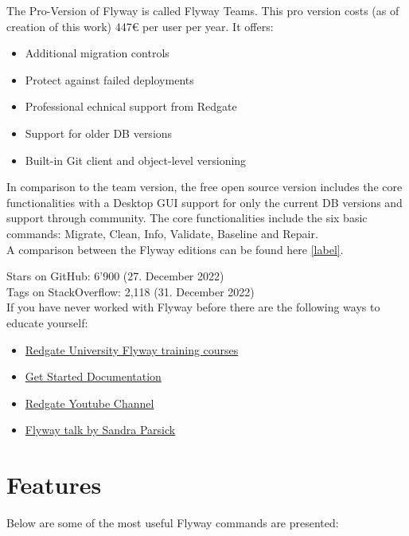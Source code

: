 %
The Pro-Version of Flyway is called Flyway Teams. This pro version costs (as of creation of this work) 447€ per user per year. It offers:
\begin{itemize}
	\item Additional migration controls
	\item Protect against failed deployments
	\item Professional echnical support from Redgate
	\item Support for older DB versions
	\item Built-in Git client and object-level versioning
\end{itemize}

In comparison to the team version, the free open source version includes the core functionalities with a Desktop GUI support for only the current DB versions and support through community. The core functionalities include the six basic commands: Migrate, Clean, Info, Validate, Baseline and Repair.\\

A comparison between the Flyway editions can be found here \autoref{label}.\\

%
Stars on GitHub: 6'900 (27. December 2022)\\
Tags on StackOverflow: 2,118 (31. December 2022)\\

%
If you have never worked with Flyway before there are the following ways to educate yourself:
\begin{itemize}
	\item \href{https://www.red-gate.com/hub/university/courses/flyway}{Redgate University Flyway training courses}
	\item \href{https://flywaydb.org/documentation}{Get Started Documentation}
	\item \href{https://www.youtube.com/playlist?list=PLhFdCK734P8DYHYYWaJpzJJ-qZFZ_JTHM}{Redgate Youtube Channel}
	\item \href{https://www.youtube.com/watch?v=dzRzlDpdDW4}{Flyway talk by Sandra Parsick}
\end{itemize}

\section{Features \label{flyway_features}}
Below are some of the most useful Flyway commands are presented:


